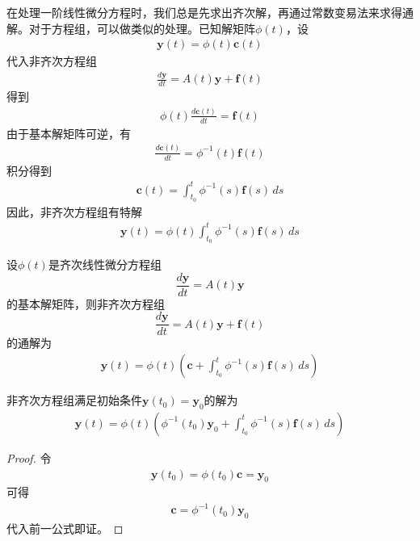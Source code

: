 在处理一阶线性微分方程时，我们总是先求出齐次解，再通过常数变易法来求得通解。对于方程组，可以做类似的处理。已知解矩阵$\phi(t)$，设\begin{align*}
    \mathbf{y}(t)=\phi(t)\mathbf{c}(t)
\end{align*}
代入非齐次方程组
\begin{align*}
    \frac{d\mathbf{y}}{dt}=A(t)\mathbf{y}+\mathbf{f}(t)
\end{align*}
得到
\begin{align*}
    \phi(t)\frac{d\mathbf{c}(t)}{dt}=\mathbf{f}(t)
\end{align*}
由于基本解矩阵可逆，有
\begin{align*}
    \frac{d\mathbf{c}(t)}{dt}=\phi^{-1}(t)\mathbf{f}(t)
\end{align*}
积分得到
\begin{align*}
    \mathbf{c}(t)=\int_{t_0}^t \phi^{-1}(s)\mathbf{f}(s)\,ds
\end{align*}
因此，非齐次方程组有特解
\begin{align*}
    \mathbf{y}(t)=\phi(t)\int_{t_0}^t \phi^{-1}(s)\mathbf{f}(s)\,ds
\end{align*}
\begin{theorem}
    设$\phi(t)$是齐次线性微分方程组
    $$\frac{d\mathbf{y}}{dt}=A(t)\mathbf{y}$$
    的基本解矩阵，则非齐次方程组
    $$\frac{d\mathbf{y}}{dt}=A(t)\mathbf{y}+\mathbf{f}(t)$$
    的通解为\begin{align*}
    \mathbf{y}(t)=\phi(t)\left(\mathbf{c}+\int_{t_0}^t \phi^{-1}(s)\mathbf{f}(s)\,ds\right)
    \end{align*}
\end{theorem}

\begin{corollary}
    非齐次方程组满足初始条件$\mathbf{y}(t_0)=\mathbf{y}_0$的解为\begin{align*}
    \mathbf{y}(t)=\phi(t)\left(\phi^{-1}(t_0)\mathbf{y}_0+\int_{t_0}^t \phi^{-1}(s)\mathbf{f}(s)\,ds\right)
    \end{align*}
\end{corollary}

\begin{proof}
    令\begin{align*}
    \mathbf{y}(t_0)=\phi(t_0)\mathbf{c}=\mathbf{y}_0
    \end{align*}
    可得\begin{align*}
    \mathbf{c}=\phi^{-1}(t_0)\mathbf{y}_0
    \end{align*}    
    代入前一公式即证。
\end{proof}

